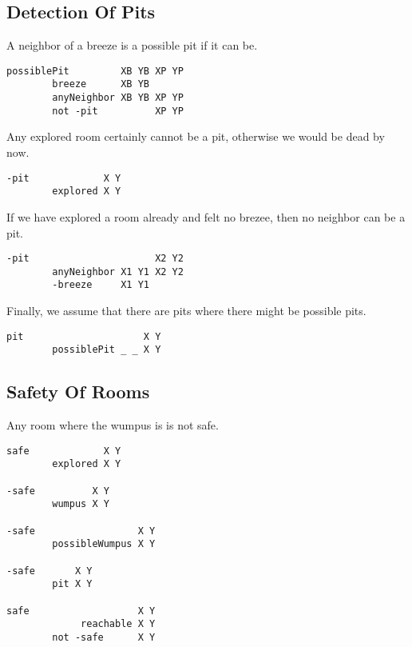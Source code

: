 \hypertarget{detection-of-pits}{%
\subsection{Detection Of Pits}\label{detection-of-pits}}

A neighbor of a breeze is a possible pit if it can be.

\begin{verbatim}
possiblePit         XB YB XP YP
        breeze      XB YB
        anyNeighbor XB YB XP YP
        not -pit          XP YP
\end{verbatim}

Any explored room certainly cannot be a pit, otherwise we would be dead
by now.

\begin{verbatim}
-pit             X Y
        explored X Y
\end{verbatim}

If we have explored a room already and felt no brezee, then no neighbor
can be a pit.

\begin{verbatim}
-pit                      X2 Y2
        anyNeighbor X1 Y1 X2 Y2
        -breeze     X1 Y1
\end{verbatim}

Finally, we assume that there are pits where there might be possible
pits.

\begin{verbatim}
pit                     X Y
        possiblePit _ _ X Y
\end{verbatim}

\hypertarget{safety-of-rooms}{%
\subsection{Safety Of Rooms}\label{safety-of-rooms}}

Any room where the wumpus is is not safe.

\begin{verbatim}
safe             X Y
        explored X Y

-safe          X Y
        wumpus X Y

-safe                  X Y
        possibleWumpus X Y

-safe       X Y
        pit X Y

safe                   X Y
             reachable X Y
        not -safe      X Y
\end{verbatim}

